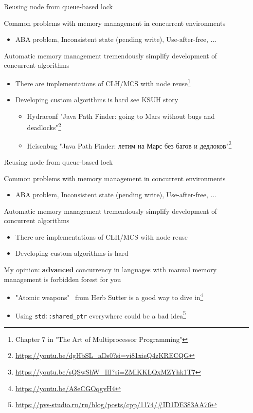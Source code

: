 \begin{frame}[t,noframenumbering]{Reusing node from queue-based lock}

Common problems with memory management in concurrent environments
\begin{itemize}
  \item ABA problem, Inconsistent state (pending write), Use-after-free, ...
\end{itemize}

\pause
Automatic memory management tremendously simplify development of concurrent algorithms

\begin{itemize}
  \pause \item There are implementations of CLH/MCS with node reuse\footnote<3->{Chapter 7 in "The Art of Multiprocessor Programming"}
  \pause \item Developing custom algorithms is hard \pause see KSUH story
  \begin{itemize}
    \item Hydraconf "Java Path Finder: going to Mars without bugs and deadlocks"\footnote<5->{\tiny\url{https://youtu.be/dgHbSL_aDs0?si=vi81xieQ4zKRECQG}}
    \item Heisenbug "Java Path Finder: летим на Марс без багов и дедлоков"\footnote<5->{\tiny\url{https://youtu.be/sQSwShW_IlI?si=ZMlKKLQxMZYhk1T7}}
  \end{itemize}
\end{itemize}
\end{frame}

\begin{frame}[t,noframenumbering]{Reusing node from queue-based lock}

Common problems with memory management in concurrent environments
\begin{itemize}
  \item ABA problem, Inconsistent state (pending write), Use-after-free, ...
\end{itemize}

Automatic memory management tremendously simplify development of concurrent algorithms

\begin{itemize}
  \item There are implementations of CLH/MCS with node reuse
  \item Developing custom algorithms is hard 
\end{itemize}
\pause

My opinion: \textbf{advanced} concurrency in languages with manual memory management is forbidden forest for you
\begin{itemize}
  \pause \item "Atomic weapons" \ from Herb Sutter is a good way to dive in\footnote<3->{\tiny\url{https://youtu.be/A8eCGOqgvH4}}
  \pause \item Using \texttt{std::shared\_ptr} everywhere could be a bad idea\footnote<4->{\tiny\url{https://pvs-studio.ru/ru/blog/posts/cpp/1174/#ID1DE383AA76}}
\end{itemize}

\end{frame}


